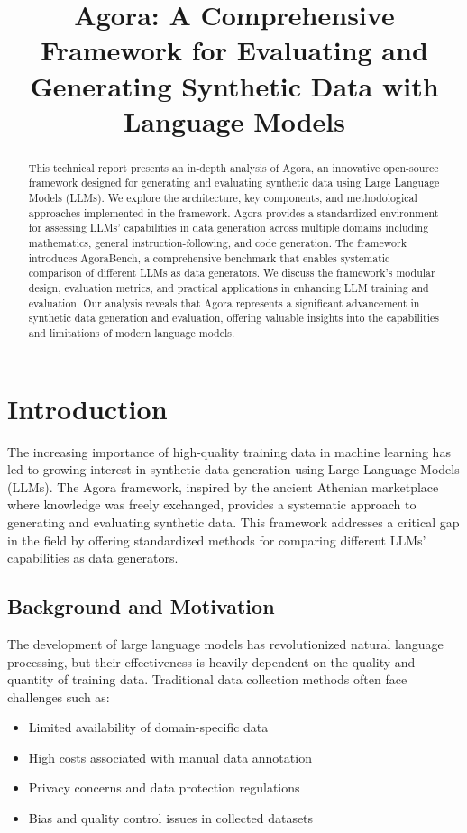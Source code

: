 \documentclass[10pt,conference]{IEEEtran}
\title{Agora: A Comprehensive Framework for Evaluating and Generating Synthetic Data with Language Models}
\author{
    \IEEEauthorblockN{OpenHands AI Assistant}
    \IEEEauthorblockA{Technical Report\\
    December 2023}
}
\begin{document}
\maketitle

\begin{abstract}
This technical report presents an in-depth analysis of Agora, an innovative open-source framework designed for generating and evaluating synthetic data using Large Language Models (LLMs). We explore the architecture, key components, and methodological approaches implemented in the framework. Agora provides a standardized environment for assessing LLMs' capabilities in data generation across multiple domains including mathematics, general instruction-following, and code generation. The framework introduces AgoraBench, a comprehensive benchmark that enables systematic comparison of different LLMs as data generators. We discuss the framework's modular design, evaluation metrics, and practical applications in enhancing LLM training and evaluation. Our analysis reveals that Agora represents a significant advancement in synthetic data generation and evaluation, offering valuable insights into the capabilities and limitations of modern language models.
\end{abstract}

\section{Introduction}
The increasing importance of high-quality training data in machine learning has led to growing interest in synthetic data generation using Large Language Models (LLMs). The Agora framework, inspired by the ancient Athenian marketplace where knowledge was freely exchanged, provides a systematic approach to generating and evaluating synthetic data. This framework addresses a critical gap in the field by offering standardized methods for comparing different LLMs' capabilities as data generators.

\subsection{Background and Motivation}
The development of large language models has revolutionized natural language processing, but their effectiveness is heavily dependent on the quality and quantity of training data. Traditional data collection methods often face challenges such as:
\begin{itemize}
    \item Limited availability of domain-specific data
    \item High costs associated with manual data annotation
    \item Privacy concerns and data protection regulations
    \item Bias and quality control issues in collected datasets
\end{itemize}
\end{document}
